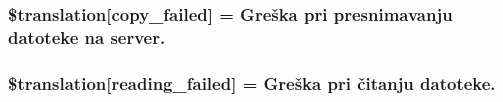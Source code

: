 \subsubsection[{\$translation}]{\setlength{\rightskip}{0pt plus 5cm}\$translation\mbox{[}\textquotesingle{}copy\+\_\+failed\textquotesingle{}\mbox{]} = \textquotesingle{}Greška pri presnimavanju datoteke na server.\textquotesingle{}}\label{class_8upload_8hr___h_r_8php_a783c9358bcf54a054545b50098bc679b}
\hypertarget{class_8upload_8hr___h_r_8php_a01bea14c9fd5f353f62db44beabfcd42}{}
\subsubsection[{\$translation}]{\setlength{\rightskip}{0pt plus 5cm}\$translation\mbox{[}\textquotesingle{}reading\+\_\+failed\textquotesingle{}\mbox{]} = \textquotesingle{}Greška pri čitanju datoteke.\textquotesingle{}}\label{class_8upload_8hr___h_r_8php_a01bea14c9fd5f353f62db44beabfcd42}
